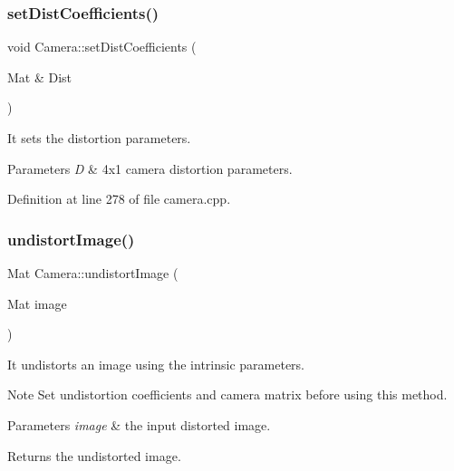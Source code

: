 \subsubsection{\texorpdfstring{setDistCoefficients()}{setDistCoefficients()}}
{\footnotesize\ttfamily void Camera\+::set\+Dist\+Coefficients (\begin{DoxyParamCaption}\item[{Mat \&}]{Dist }\end{DoxyParamCaption})}



It sets the distortion parameters. 


\begin{DoxyParams}{Parameters}
{\em D} & 4x1 camera distortion parameters. \\
\hline
\end{DoxyParams}


Definition at line 278 of file camera.\+cpp.


\begin{DoxyCode}{0}

\end{DoxyCode}
\mbox{\label{classCamera_ae261c6f36e0b9c6aa40917b60ae7b1fa}} 
\subsubsection{\texorpdfstring{undistortImage()}{undistortImage()}}
{\footnotesize\ttfamily Mat Camera\+::undistort\+Image (\begin{DoxyParamCaption}\item[{Mat}]{image }\end{DoxyParamCaption})}



It undistorts an image using the intrinsic parameters. 

\begin{DoxyNote}{Note}
Set undistortion coefficients and camera matrix before using this method. 
\end{DoxyNote}

\begin{DoxyParams}{Parameters}
{\em image} & the input distorted image. \\
\hline
\end{DoxyParams}
\begin{DoxyReturn}{Returns}
the undistorted image. 
\end{DoxyReturn}


